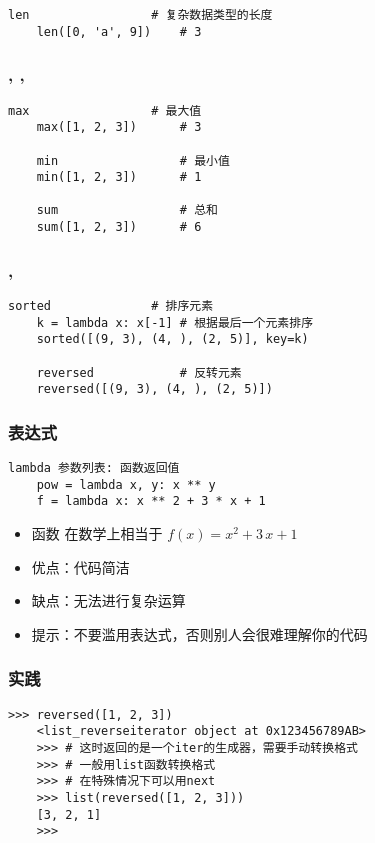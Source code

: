 \begin{CJK}{UTF8}{gbsn}
\begin{frame} [fragile]
\begin{lstlisting}[style=pythonstyle, gobble=4, texcl]
	len					# 复杂数据类型的长度
	len([0, 'a', 9])	# 3
	\end{lstlisting}
\end{frame}

\begin{frame} [fragile]
	\frametitle{, , }
	\linespread{1.5}
	\begin{lstlisting}[style=pythonstyle, gobble=4, texcl]
	max					# 最大值
	max([1, 2, 3])		# 3

	min					# 最小值
	min([1, 2, 3])		# 1

	sum					# 总和
	sum([1, 2, 3])		# 6
	\end{lstlisting}
\end{frame}

\begin{frame} [fragile]
	\frametitle{, }
	\linespread{1.5}
	\begin{lstlisting}[style=pythonstyle, gobble=4, texcl]
	sorted				# 排序元素
	k = lambda x: x[-1]	# 根据最后一个元素排序
	sorted([(9, 3), (4, ), (2, 5)], key=k)

	reversed			# 反转元素
	reversed([(9, 3), (4, ), (2, 5)])
	\end{lstlisting}
\end{frame}

\begin{frame} [fragile]
	\frametitle{表达式}
	\linespread{1.5}
	\begin{lstlisting}[style=pythonstyle, gobble=4, texcl]
	lambda 参数列表: 函数返回值
	pow = lambda x, y: x ** y
	f = lambda x: x ** 2 + 3 * x + 1
	\end{lstlisting}
	\begin{itemize}
	\item 函数  在数学上相当于 $f(x) = x^2 + 3\,x + 1$
	\item 优点：代码简洁
	\item 缺点：无法进行复杂运算
	\item 提示：不要滥用表达式，否则别人会很难理解你的代码
	\end{itemize}
\end{frame}

\begin{frame} [fragile]
	\frametitle{实践}
	\linespread{1.25}
	\begin{lstlisting}[style=pythonstyle, gobble=4, texcl]
	>>> reversed([1, 2, 3])
	<list_reverseiterator object at 0x123456789AB>
	>>> # 这时返回的是一个iter的生成器，需要手动转换格式
	>>> # 一般用list函数转换格式
	>>> # 在特殊情况下可以用next
	>>> list(reversed([1, 2, 3]))
	[3, 2, 1]
	>>>
	\end{lstlisting}
\end{frame}


\end{CJK}
